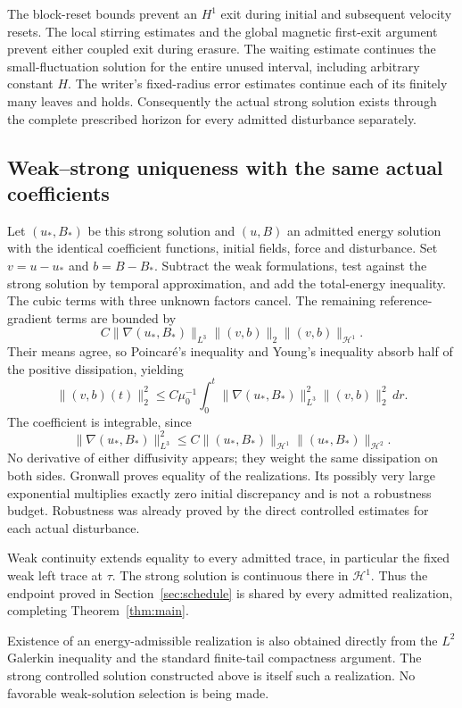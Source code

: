 \documentclass[11pt,a4paper]{amsart}
\theoremstyle{definition}
\theoremstyle{remark}
\numberwithin{equation}{section}
\newcommand{\Hcal}{\mathcal H}
\newcommand{\norm}[1]{\lVert #1\rVert}
\begin{document}
The block-reset bounds prevent an $H^1$ exit during initial and subsequent velocity resets. The local stirring estimates and the global magnetic first-exit argument prevent either coupled exit during erasure. The waiting estimate continues the small-fluctuation solution for the entire unused interval, including arbitrary constant $H$. The writer's fixed-radius error estimates continue each of its finitely many leaves and holds. Consequently the actual strong solution exists through the complete prescribed horizon for every admitted disturbance separately.

\subsection{Weak--strong uniqueness with the same actual coefficients}
Let $(u_*,B_*)$ be this strong solution and $(u,B)$ an admitted energy solution with the identical coefficient functions, initial fields, force and disturbance. Set $v=u-u_*$ and $b=B-B_*$. Subtract the weak formulations, test against the strong solution by temporal approximation, and add the total-energy inequality. The cubic terms with three unknown factors cancel. The remaining reference-gradient terms are bounded by
\[
 C\norm{\nabla(u_*,B_*)}_{L^3}
       \norm{(v,b)}_2\norm{(v,b)}_{\Hcal^1}.
\]
Their means agree, so Poincar\'e's inequality and Young's inequality absorb half of the positive dissipation, yielding
\begin{equation}\label{eq:weakstrong}
 \norm{(v,b)(t)}_2^2
 \le C\mu_0^{-1}\int_0^t
      \norm{\nabla(u_*,B_*)}_{L^3}^2
      \norm{(v,b)}_2^2\,dr.
\end{equation}
The coefficient is integrable, since
\[
 \norm{\nabla(u_*,B_*)}_{L^3}^2
 \le C\norm{(u_*,B_*)}_{\Hcal^1}\norm{(u_*,B_*)}_{\Hcal^2}.
\]
No derivative of either diffusivity appears; they weight the same dissipation on both sides. Gronwall proves equality of the realizations. Its possibly very large exponential multiplies exactly zero initial discrepancy and is not a robustness budget. Robustness was already proved by the direct controlled estimates for each actual disturbance.

Weak continuity extends equality to every admitted trace, in particular the fixed weak left trace at $\tau$. The strong solution is continuous there in $\Hcal^1$. Thus the endpoint proved in Section~\ref{sec:schedule} is shared by every admitted realization, completing Theorem~\ref{thm:main}.

Existence of an energy-admissible realization is also obtained directly from the $L^2$ Galerkin inequality and the standard finite-tail compactness argument. The strong controlled solution constructed above is itself such a realization. No favorable weak-solution selection is being made.
\end{document}
